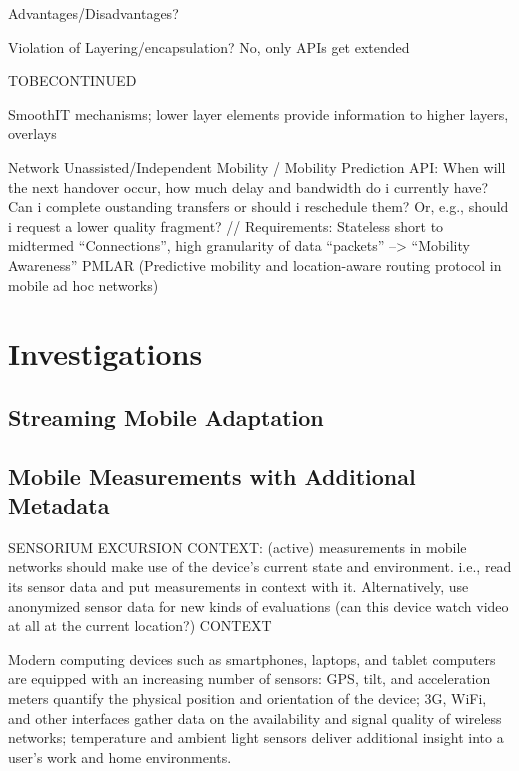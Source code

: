 Advantages/Disadvantages?

Violation of Layering/encapsulation? No, only APIs get extended 

TOBECONTINUED

SmoothIT mechanisms; lower layer elements provide information to higher layers, overlays  \cite{oechsner2009pushing}


Network Unassisted/Independent Mobility / Mobility Prediction API: When will the next handover occur, how much delay and bandwidth do i currently have? Can i complete oustanding transfers or should i reschedule them? Or, e.g., should i request a lower quality fragment? // Requirements: Stateless short to midtermed ``Connections'', high granularity of data ``packets''
--> ``Mobility Awareness'' \cite{hummel2010mobilitaet} PMLAR (Predictive mobility and location-aware routing protocol in mobile ad hoc networks)





\section{Investigations}


\subsection{Streaming Mobile Adaptation}



\subsection{Mobile Measurements with Additional Metadata}
\label{c5:sensorium}

SENSORIUM EXCURSION
CONTEXT: (active) measurements in mobile networks should make use of the device's current state and environment. i.e., read its sensor data and put measurements in context with it. Alternatively, use anonymized sensor data for new kinds of evaluations (can this device watch video at all at the current location?)
CONTEXT

Modern computing devices such as smartphones, laptops, and tablet computers are equipped with an increasing number of sensors: GPS, tilt, and acceleration meters quantify the physical position and orientation of the device; 3G, WiFi, and other  interfaces gather data on the availability and signal quality of wireless networks; temperature and ambient light sensors deliver additional insight into a user's work and home environments.

